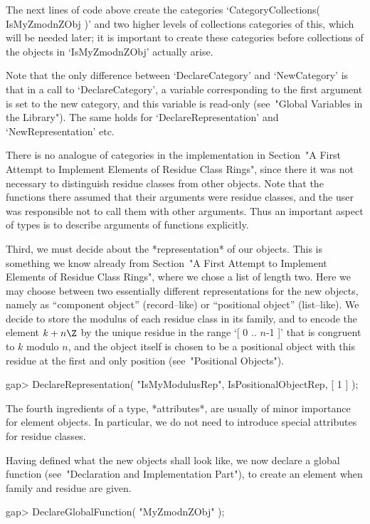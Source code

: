 The next lines of {\GAP} code above create the categories
`CategoryCollections( IsMyZmodnZObj )' and two higher levels of collections
categories of this, which will be needed later;
it is important to create these categories before collections of the objects
in `IsMyZmodnZObj' actually arise.

Note that the only difference between `DeclareCategory' and `NewCategory'
is that in a call to `DeclareCategory', a variable corresponding to the
first argument is set to the new category, and this variable is read-only
(see~"Global Variables in the Library").
The same holds for `DeclareRepresentation' and `NewRepresentation' etc.

There is no analogue of categories in the implementation in
Section~"A First Attempt to Implement Elements of Residue Class Rings",
since there it was not necessary to distinguish residue classes from
other {\GAP} objects.
Note that the functions there assumed that their arguments were residue
classes, and the user was responsible not to call them with other
arguments.
Thus an important aspect of types is to describe arguments of functions
explicitly.

Third, we must decide about the *representation* of our objects.
This is something we know already from
Section~"A First Attempt to Implement Elements of Residue Class Rings",
where we chose a list of length two.
Here we may choose between two essentially different representations for
the new {\GAP} objects, namely as ``component object'' (record--like)
or ``positional object'' (list--like).
We decide to store the modulus of each residue class in its family,
and to encode the element $k + n\Z$ by the unique residue in the range
`[ 0 .. $n$-1 ]' that is congruent to $k$ modulo $n$,
and the object itself is chosen to be a positional object with this
residue at the first and only position (see~"Positional Objects").

\beginexample
gap> DeclareRepresentation( "IsMyModulusRep", IsPositionalObjectRep, [ 1 ] );
\endexample

The fourth ingredients of a type, *attributes*, are usually of minor
importance for element objects.
In particular,
we do not need to introduce special attributes for residue classes.

Having defined what the new objects shall look like,
we now declare a global function
(see~"Declaration and Implementation Part"),
to create an element when family and residue are given.

\beginexample
gap> DeclareGlobalFunction( "MyZmodnZObj" );
\endexample

